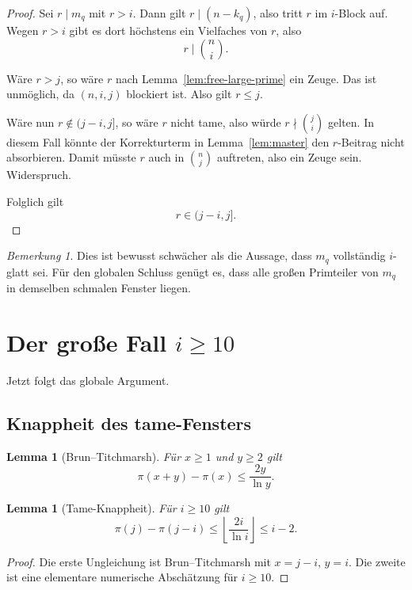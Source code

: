 \documentclass[12pt,a4paper]{article}
\theoremstyle{plain}
\newtheorem{lemma}[theorem]{Lemma}
\theoremstyle{definition}
\theoremstyle{remark}
\newtheorem{remark}[theorem]{Bemerkung}
\begin{document}
	\begin{proof}
		Sei \(r\mid m_q\) mit \(r>i\). Dann gilt \(r\mid(n-k_q)\), also tritt \(r\) im \(i\)-Block auf. Wegen \(r>i\) gibt es dort höchstens ein Vielfaches von \(r\), also
		\[
		r\mid \binom ni.
		\]
		
		Wäre \(r>j\), so wäre \(r\) nach Lemma~\ref{lem:free-large-prime} ein Zeuge. Das ist unmöglich, da \((n,i,j)\) blockiert ist. Also gilt \(r\le j\).
		
		Wäre nun \(r\notin(j-i,j]\), so wäre \(r\) nicht tame, also würde \(r\nmid\binom ji\) gelten. In diesem Fall könnte der Korrekturterm in Lemma~\ref{lem:master} den \(r\)-Beitrag nicht absorbieren. Damit müsste \(r\) auch in \(\binom nj\) auftreten, also ein Zeuge sein. Widerspruch.
		
		Folglich gilt
		\[
		r\in(j-i,j].
		\]
	\end{proof}
	
	\begin{remark}
		Dies ist bewusst schwächer als die Aussage, dass \(m_q\) vollständig \(i\)-glatt sei. Für den globalen Schluss genügt es, dass alle großen Primteiler von \(m_q\) in demselben schmalen Fenster liegen.
	\end{remark}
	
	\section{Der große Fall \(i\ge10\)}
	
	Jetzt folgt das globale Argument.
	
	\subsection{Knappheit des tame-Fensters}
	
	\begin{lemma}[Brun--Titchmarsh]
		Für \(x\ge1\) und \(y\ge2\) gilt
		\[
		\pi(x+y)-\pi(x)\le \frac{2y}{\ln y}.
		\]
	\end{lemma}
	
	\begin{lemma}[Tame-Knappheit]
		\label{lem:tame-scarcity}
		Für \(i\ge10\) gilt
		\[
		\pi(j)-\pi(j-i)\le \left\lfloor \frac{2i}{\ln i}\right\rfloor \le i-2.
		\]
	\end{lemma}
	
	\begin{proof}
		Die erste Ungleichung ist Brun--Titchmarsh mit \(x=j-i\), \(y=i\). Die zweite ist eine elementare numerische Abschätzung für \(i\ge10\).
	\end{proof}
	
\end{document}
